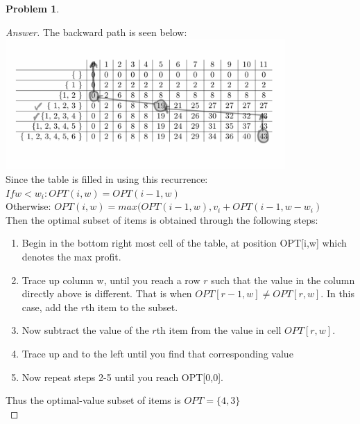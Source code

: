 \documentclass[11pt]{article}
\theoremstyle{definition}
\theoremstyle{definition}
\newtheorem{required}{Problem}
\theoremstyle{definition}
\begin{document}
\begin{required}
\begin{proof}[Answer]
The backward path is seen below:  \\
\includegraphics[width=0.8\textwidth]{hw8q1} \\

Since the table is filled in using this recurrence:\\
$If w<w_i: OPT(i,w)=OPT(i-1,w)$ \\
Otherwise: $OPT(i,w)=max(OPT(i-1,w), v_i+OPT(i-1,w-w_i)$ \\
Then the optimal subset of items is obtained through the following steps: 
\begin{enumerate}
\item Begin in the bottom right most cell of the table, at position OPT[i,w] which denotes the max profit. 
\item Trace up column w,  until you reach a row $r$ such that the value in the column directly above is different. That is when $OPT[r-1, w] \ne OPT[r,w]$. In this case, add the $r$th item to the subset. 
\item Now subtract the value of the $r$th item from the value in cell $OPT[r,w]$. 
\item Trace up and to the left until you find that corresponding value
\item Now repeat steps 2-5 until you reach OPT[0,0]. 
\end{enumerate}
Thus the optimal-value subset of items is $OPT = \{4,3\}$ \\


\end{proof}


\end{required}
\end{document}
